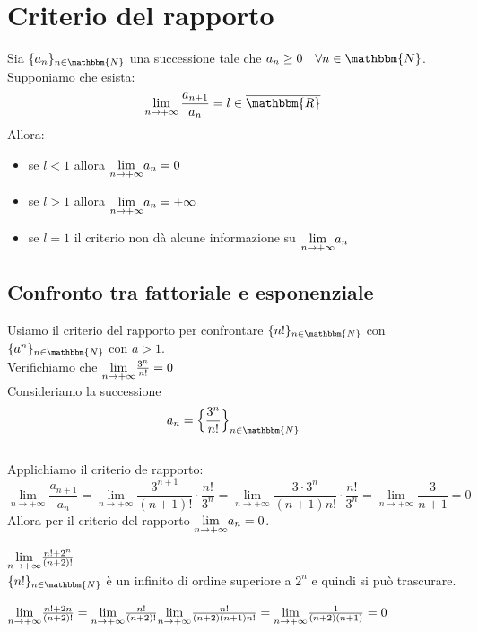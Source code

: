 \documentclass[12pt]{report}
\newcounter{exercise}
\begin{document}
	\section{Criterio del rapporto}
	Sia $\{a_n\}_{n \in \mathbbm{N}}$ una successione tale che $a_n \geq 0 \quad \forall n \in \mathbbm{N}$. Supponiamo che esista:
	\[
	\lim_{n \to +\infty}\frac{a_{n + 1}}{a_n} = l \in \overline{\mathbbm{R}}
	\]
	Allora:
	\begin{itemize}
		\item se $l < 1$ allora $\mathlarger{\lim_{n \to +\infty}}a_n = 0$
		\item se $l > 1$ allora $\mathlarger{\lim_{n \to +\infty}}a_n = +\infty$
		\item se $l=1$ il criterio non dà alcune informazione su $\mathlarger{\lim_{n \to +\infty}}a_n$
	\end{itemize}
	\subsection{Confronto tra fattoriale e esponenziale}
	Usiamo il criterio del rapporto per confrontare $\{n!\}_{n \in \mathbbm{N}}$ con $\{a^n\}_{n \in \mathbbm{N}}$ con $a > 1$. \\
	Verifichiamo che $\mathlarger{\lim_{n \to +\infty}}\frac{3^n}{n!} = 0$ \\
	Consideriamo la successione \[a_n = \Bigl\{\frac{3^n}{n!}\Bigr\}_{n \in \mathbbm{N}}\] \\
	Applichiamo il criterio de rapporto:
	\[
	\lim_{n \to +\infty}\frac{a_{n + 1}}{a_n} = \lim_{n \to +\infty}\frac{3^{n+1}}{(n+1)!} \cdot \frac{n!}{3^n} = \lim_{n \to +\infty}\frac{3 \cdot 3^n}{(n + 1)n!}\cdot \frac{n!}{3^n} = \lim_{n \to +\infty}\frac{3}{n+1}=0
	\]
	Allora per il criterio del rapporto $\mathlarger{\lim_{n \to +\infty}}a_n = 0$. \\
	\begin{assignment}{}{}
		$\mathlarger{\lim_{n \to +\infty}}\frac{n! + 2^n}{(n + 2)!}$ \\
		$\{n!\}_{n \in \mathbbm{N}}$ è un infinito di ordine superiore a $2^n$ e quindi si può trascurare.
		\begin{exercise}{}{}
			$\mathlarger{\lim_{n \to +\infty}}\frac{n! + 2n}{(n + 2)!}=\mathlarger{\lim_{n \to +\infty}}\frac{n!}{(n + 2)!}\\\mathlarger{\lim_{n \to +\infty}}\frac{n!}{(n + 2)(n + 1)n!} = \mathlarger{\lim_{n \to +\infty}}\frac{1}{(n + 2)(n + 1)} = 0$
		\end{exercise}
	\end{assignment}
\end{document}
